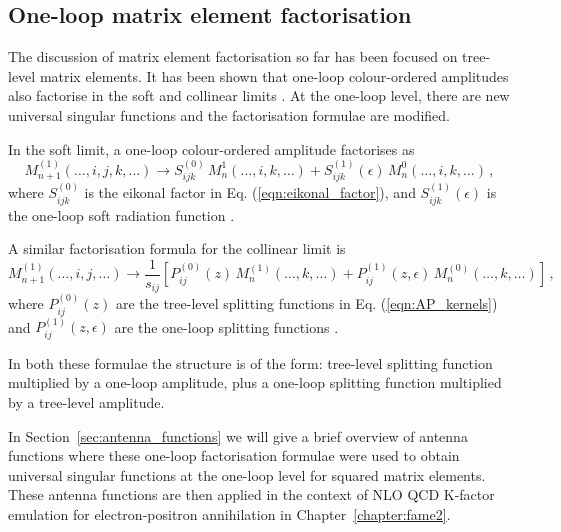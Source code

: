 \documentclass[main.tex]{subfiles}
\begin{document}
\subsection{One-loop matrix element factorisation}\label{sec:OL_factorisation}
    The discussion of matrix element factorisation so
    far has been focused on tree-level matrix elements.
    It has been shown that one-loop colour-ordered amplitudes
    also factorise in the soft and collinear limits \cite{Bern:1994zx,Bern:1995ix,Bern:1998sc,Kosower:1999xi}.
    At the one-loop level, there are new universal singular
    functions and the factorisation formulae are modified.

    In the soft limit, a one-loop colour-ordered amplitude
    factorises as
    \begin{equation}\label{eqn:1L_soft_factorisation}
        M_{n+1}^{(1)}(\ldots, i, j, k, \ldots) \rightarrow S_{ijk}^{(0)} \, M_{n}^{1}(\ldots, i, k, \ldots) + S_{ijk}^{(1)}(\epsilon) \, M_{n}^{0}(\ldots, i, k, \ldots) \, ,
    \end{equation}
    where $S_{ijk}^{(0)}$ is the eikonal factor in Eq. (\ref{eqn:eikonal_factor}),
    and $S_{ijk}^{(1)}(\epsilon)$ is the one-loop soft radiation function \cite{Bern:1999ry}.

    A similar factorisation formula for the collinear limit is
    \begin{equation}\label{eqn:1L_collinear_factorisation}
        M_{n+1}^{(1)}(\ldots, i, j, \ldots) \rightarrow \dfrac{1}{s_{ij}} \left[ P_{ij}^{(0)}(z) \, M_{n}^{(1)}(\ldots, k, \ldots) + P_{ij}^{(1)}(z, \epsilon) \, M_{n}^{(0)}(\ldots, k, \ldots) \right] \, ,
    \end{equation}
    where $P_{ij}^{(0)}(z)$ are the tree-level splitting functions
    in Eq. (\ref{eqn:AP_kernels}) and $P_{ij}^{(1)}(z, \epsilon)$
    are the one-loop splitting functions \cite{Bern:1999ry}.

    In both these formulae the structure is of the form:
    tree-level splitting function multiplied by a one-loop
    amplitude, plus a one-loop splitting function multiplied
    by a tree-level amplitude.

    In Section~\ref{sec:antenna_functions} we will give
    a brief overview of antenna functions where these one-loop
    factorisation formulae were used to obtain universal singular functions
    at the one-loop level for squared matrix elements. These
    antenna functions are then applied in the context of NLO QCD
    K-factor emulation for electron-positron annihilation in Chapter~\ref{chapter:fame2}.
\end{document}
